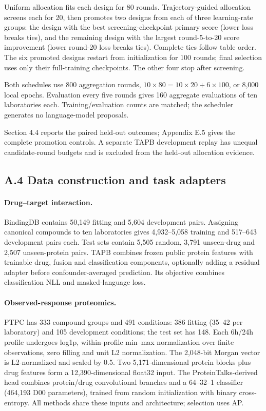 Uniform allocation fits each design for 80 rounds. Trajectory-guided allocation screens each for 20, then promotes two designs from each of three learning-rate groups: the design with the best screening-checkpoint primary score (lower loss breaks ties), and the remaining design with the largest round-5-to-20 score improvement (lower round-20 loss breaks ties). Complete ties follow table order. The six promoted designs restart from initialization for 100 rounds; final selection uses only their full-training checkpoints. The other four stop after screening.

Both schedules use 800 aggregation rounds, $10\times80=10\times20+6\times100$, or 8,000 local epochs. Evaluation every five rounds gives 160 aggregate evaluations of ten laboratories each. Training/evaluation counts are matched; the scheduler generates no language-model proposals.

Section 4.4 reports the paired held-out outcomes; Appendix E.5 gives the complete promotion controls. A separate TAPB development replay has unequal candidate-round budgets and is excluded from the held-out allocation evidence.

\subsection*{A.4 Data construction and task adapters}
\paragraph{Drug--target interaction.}
BindingDB contains 50,149 fitting and 5,604 development pairs. Assigning canonical compounds to ten laboratories gives 4,932--5,058 training and 517--643 development pairs each. Test sets contain 5,505 random, 3,791 unseen-drug and 2,507 unseen-protein pairs. TAPB combines frozen public protein features with trainable drug, fusion and classification components, optionally adding a residual adapter before confounder-averaged prediction. Its objective combines classification NLL and masked-language loss.

\paragraph{Observed-response proteomics.}
PTPC has 333 compound groups and 491 conditions: 386 fitting (35--42 per laboratory) and 105 development conditions; the test set has 148. Each 6h/24h profile undergoes log1p, within-profile min--max normalization over finite observations, zero filling and unit L2 normalization. The 2,048-bit Morgan vector is L2-normalized and scaled by 0.5. Two 5,171-dimensional protein blocks plus drug features form a 12,390-dimensional float32 input. The ProteinTalks-derived head combines protein/drug convolutional branches and a 64--32--1 classifier (464,193 D00 parameters), trained from random initialization with binary cross-entropy. All methods share these inputs and architecture; selection uses AP.

